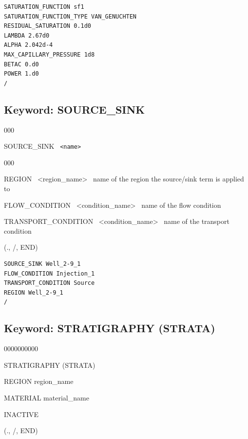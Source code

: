 \documentclass[12pt]{article}
\begin{document}

\begin{verbatim}
SATURATION_FUNCTION sf1
SATURATION_FUNCTION_TYPE VAN_GENUCHTEN
RESIDUAL_SATURATION 0.1d0
LAMBDA 2.67d0
ALPHA 2.042d-4
MAX_CAPILLARY_PRESSURE 1d8
BETAC 0.d0
POWER 1.d0
/
\end{verbatim}


\newpage
\protect\hypertarget{target_src}{}

\subsection{Keyword: SOURCE\_SINK}
\begin{deflist}{000}
\item[SOURCE\_SINK] \ {\tt <name>}
\begin{deflist}{000}
\item[REGION] \ <region\_name> \ name of the region the source/sink term is applied to
\item[FLOW\_CONDITION] \ <condition\_name> \ name of the flow condition
\item[TRANSPORT\_CONDITION] \ <condition\_name> \ name of the transport condition
\end{deflist}
\item[(., /, END)]
\end{deflist}

\begin{verbatim}
SOURCE_SINK Well_2-9_1
FLOW_CONDITION Injection_1
TRANSPORT_CONDITION Source
REGION Well_2-9_1
/
\end{verbatim}


\newpage
\protect\hypertarget{target_strata}{}

\subsection{Keyword: STRATIGRAPHY (STRATA)}
\begin{deflist}{0000000000}
\item[STRATIGRAPHY (STRATA)]
\item  REGION region\_name
\item  MATERIAL material\_name
\item  INACTIVE
\item[(., /, END)]
\end{deflist}
\end{document}
